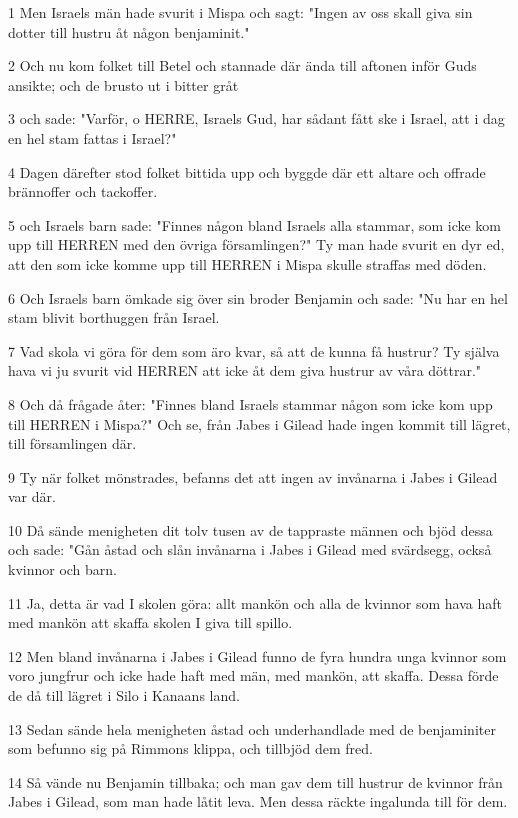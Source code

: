\par 1 Men Israels män hade svurit i Mispa och sagt: "Ingen av oss skall giva sin dotter till hustru åt någon benjaminit."
\par 2 Och nu kom folket till Betel och stannade där ända till aftonen inför Guds ansikte; och de brusto ut i bitter gråt
\par 3 och sade: "Varför, o HERRE, Israels Gud, har sådant fått ske i Israel, att i dag en hel stam fattas i Israel?"
\par 4 Dagen därefter stod folket bittida upp och byggde där ett altare och offrade brännoffer och tackoffer.
\par 5 och Israels barn sade: "Finnes någon bland Israels alla stammar, som icke kom upp till HERREN med den övriga församlingen?" Ty man hade svurit en dyr ed, att den som icke komme upp till HERREN i Mispa skulle straffas med döden.
\par 6 Och Israels barn ömkade sig över sin broder Benjamin och sade: "Nu har en hel stam blivit borthuggen från Israel.
\par 7 Vad skola vi göra för dem som äro kvar, så att de kunna få hustrur? Ty själva hava vi ju svurit vid HERREN att icke åt dem giva hustrur av våra döttrar."
\par 8 Och då frågade åter: "Finnes bland Israels stammar någon som icke kom upp till HERREN i Mispa?" Och se, från Jabes i Gilead hade ingen kommit till lägret, till församlingen där.
\par 9 Ty när folket mönstrades, befanns det att ingen av invånarna i Jabes i Gilead var där.
\par 10 Då sände menigheten dit tolv tusen av de tappraste männen och bjöd dessa och sade: "Gån åstad och slån invånarna i Jabes i Gilead med svärdsegg, också kvinnor och barn.
\par 11 Ja, detta är vad I skolen göra: allt mankön och alla de kvinnor som hava haft med mankön att skaffa skolen I giva till spillo.
\par 12 Men bland invånarna i Jabes i Gilead funno de fyra hundra unga kvinnor som voro jungfrur och icke hade haft med män, med mankön, att skaffa. Dessa förde de då till lägret i Silo i Kanaans land.
\par 13 Sedan sände hela menigheten åstad och underhandlade med de benjaminiter som befunno sig på Rimmons klippa, och tillbjöd dem fred.
\par 14 Så vände nu Benjamin tillbaka; och man gav dem till hustrur de kvinnor från Jabes i Gilead, som man hade låtit leva. Men dessa räckte ingalunda till för dem.
